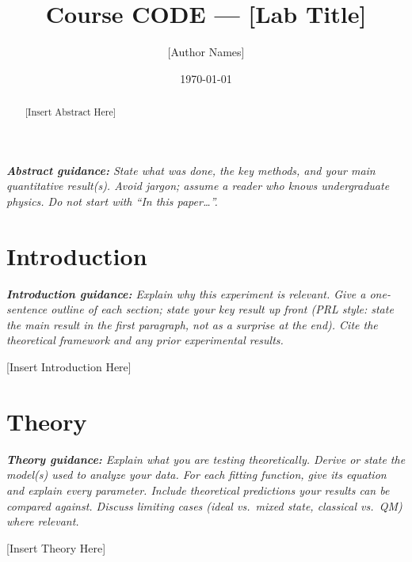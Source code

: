 \documentclass[twocolumn, 10pt]{article}
\title{Course CODE — [Lab Title]}
\author{[Author Names]}
\date{\today}
\begin{document}
\maketitle

\begin{abstract}
[Insert Abstract Here]
\end{abstract}

\begin{guidance}
\textit{\color{gray!60!black}\small\textbf{Abstract guidance:}
  State what was done, the key methods, and your main quantitative result(s).
  Avoid jargon; assume a reader who knows undergraduate physics.
  Do not start with ``In this paper\ldots''.}
\end{guidance}

\section{Introduction}
\begin{guidance}
\textit{\color{gray!60!black}\small\textbf{Introduction guidance:}
  Explain why this experiment is relevant.
  Give a one-sentence outline of each section; state your key result up front
  (PRL style: state the main result in the first paragraph, not as a surprise at the end).
  Cite the theoretical framework and any prior experimental results.}
\end{guidance}
[Insert Introduction Here]

\section{Theory}
\label{sec:theory}
\begin{guidance}
\textit{\color{gray!60!black}\small\textbf{Theory guidance:}
  Explain what you are testing theoretically.
  Derive or state the model(s) used to analyze your data.
  For each fitting function, give its equation and explain every parameter.
  Include theoretical predictions your results can be compared against.
  Discuss limiting cases (ideal vs.\ mixed state, classical vs.\ QM) where relevant.}
\end{guidance}
[Insert Theory Here]

\end{document}
